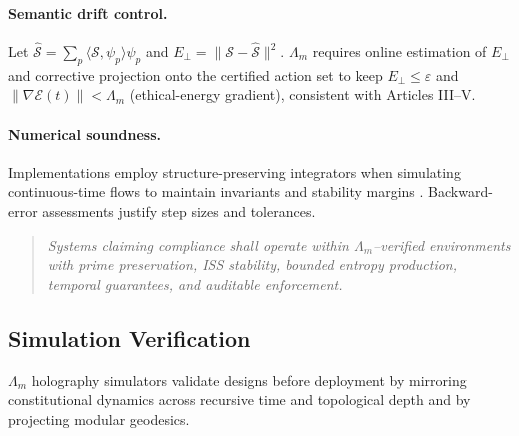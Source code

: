 \documentclass[12pt]{amsart}
\theoremstyle{plain}
\begin{document}
\paragraph{Semantic drift control.}
Let $\widehat{\mathcal{S}}=\sum_p\langle\mathcal{S},\psi_p\rangle\psi_p$ and $E_\perp=\|\mathcal{S}-\widehat{\mathcal{S}}\|^2$. $\Lambda_m$ requires online estimation of $E_\perp$ and corrective projection onto the certified action set to keep $E_\perp\le\varepsilon$ and $\|\nabla\mathcal{E}(t)\|<\Lambda_m$ (ethical-energy gradient), consistent with Articles III–V.

\paragraph{Numerical soundness.}
Implementations employ structure-preserving integrators when simulating continuous-time flows to maintain invariants and stability margins \cite{hairer2006geometric}. Backward-error assessments justify step sizes and tolerances.

\begin{quote}
\textit{Systems claiming compliance shall operate within $\Lambda_m$–verified environments with prime preservation, ISS stability, bounded entropy production, temporal guarantees, and auditable enforcement.}
\end{quote}

\subsection{Simulation Verification}

$\Lambda_m$ holography simulators validate designs before deployment by mirroring constitutional dynamics across recursive time and topological depth and by projecting modular geodesics.
\end{document}
